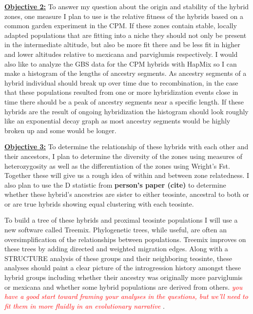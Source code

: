\documentclass[12pt]{amsart}
\newcommand{\mbh}[1]{\textcolor{red}{ \emph{\scriptsize  #1}} }
\begin{document}
\hfill\break \textbf{\underline{Objective 2:} }To answer my question about the origin and stability of the hybrid zones, one measure I plan to use is the relative fitness of the hybrids based on a common garden experiment in the CPM. 
If these zones contain stable, locally adapted populations that are fitting into a niche they should not only be present in the intermediate altitude, but also be more fit there and be less fit in higher and lower altitudes relative to mexicana and parviglumis respectively.
I would also like to analyze the GBS data for the CPM hybrids with HapMix so I can make a histogram of the lengths of ancestry segments.
As ancestry segments of a hybrid individual should break up over time due to recombination, in the case that these populations resulted from one or more hybridization events close in time there should be a peak of ancestry segments near a specific length.
If these hybrids are the result of ongoing hybridization the histogram should look roughly like an exponential decay graph as most ancestry segments would be highly broken up and some would be longer.%

\hfill\break \textbf{\underline{Objective 3:} } To determine the relationship of these hybrids with each other and their ancestors, I plan to determine the diversity of the zones using measures of heterozygosity as well as the differentiation of the zones using Wright's Fst.  
Together these will give us a rough idea of within and between zone relatedness.
I also plan to use the D statistic from \textbf{person's paper (cite)} to determine whether these hybrid's ancestries are sister to either teosinte, ancestral to both or or are true hybrids showing equal clustering with each teosinte.

To build a tree of these hybrids and proximal teosinte populations I will use a new software called Treemix.
Phylogenetic trees, while useful, are often an oversimplification of the relationships between populations. %
Treemix improves on these trees by adding directed and weighted migration edges. %
Along with a STRUCTURE analysis of these groups and their neighboring teosinte, these analyses should paint a clear picture of the introgression history amongst these hybrid groups including whether their ancestry was originally more parviglumis or mexicana and whether some hybrid populations are derived from others.
\mbh{you have a good start toward framing your analyses in the questions, but we'll need to fit them in more fluidly in an evolutionary narrative}.
\end{document}
